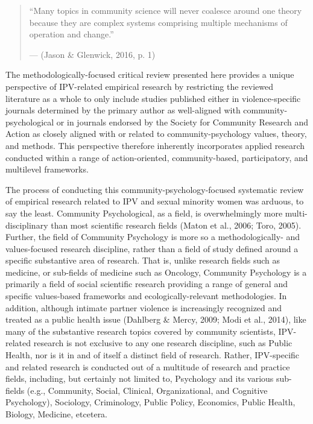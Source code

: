 \documentclass[11pt,]{tufte-book}
\begin{document}
\begin{quote}
``Many topics in community science will never coalesce around one theory
because they are complex systems comprising multiple mechanisms of
operation and change.''

\hfill --- (Jason \& Glenwick, 2016, p. 1)
\end{quote}

The methodologically-focused critical review presented here provides a
unique perspective of IPV-related empirical research by restricting the
reviewed literature as a whole to only include studies published either
in violence-specific journals determined by the primary author as
well-aligned with community-psychological or in journals endorsed by the
Society for Community Research and Action as closely aligned with or
related to community-psychology values, theory, and methods. This
perspective therefore inherently incorporates applied research conducted
within a range of action-oriented, community-based, participatory, and
multilevel frameworks.

The process of conducting this community-psychology-focused systematic
review of empirical research related to IPV and sexual minority women
was arduous, to say the least. Community Psychological, as a field, is
overwhelmingly more multi-disciplinary than most scientific research
fields (Maton et al., 2006; Toro, 2005). Further, the field of Community
Psychology is more so a methodologically- and values-focused research
discipline, rather than a field of study defined around a specific
substantive area of research. That is, unlike research fields such as
medicine, or sub-fields of medicine such as Oncology, Community
Psychology is a primarily a field of social scientific research
providing a range of general and specific values-based frameworks and
ecologically-relevant methodologies. In addition, although intimate
partner violence is increasingly recognized and treated as a public
health issue (Dahlberg \& Mercy, 2009; Modi et al., 2014), like many of
the substantive research topics covered by community scientists,
IPV-related research is not exclusive to any one research discipline,
such as Public Health, nor is it in and of itself a distinct field of
research. Rather, IPV-specific and related research is conducted out of
a multitude of research and practice fields, including, but certainly
not limited to, Psychology and its various sub-fields (e.g., Community,
Social, Clinical, Organizational, and Cognitive Psychology), Sociology,
Criminology, Public Policy, Economics, Public Health, Biology, Medicine,
etcetera.
\end{document}
